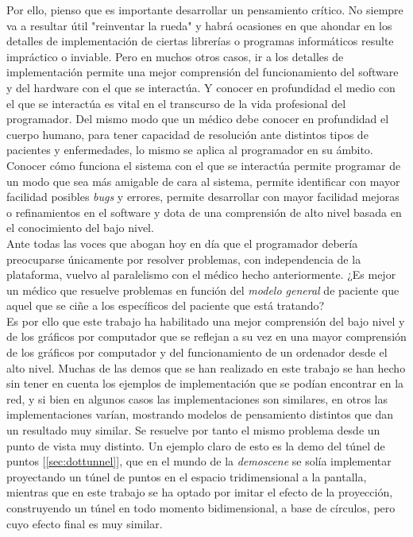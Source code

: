 Por ello, pienso que es importante desarrollar un pensamiento crítico. No siempre va a resultar útil "reinventar la rueda" y habrá ocasiones en que ahondar en los detalles de implementación de ciertas librerías o programas informáticos resulte impráctico o inviable. Pero en muchos otros casos, ir a los detalles de implementación permite una mejor comprensión del funcionamiento del software y del hardware con el que se interactúa. Y conocer en profundidad el medio con el que se interactúa es vital en el transcurso de la vida profesional del programador. Del mismo modo que un médico debe conocer en profundidad el cuerpo humano, para tener capacidad de resolución ante distintos tipos de pacientes y enfermedades, lo mismo se aplica al programador en su ámbito. Conocer cómo funciona el sistema con el que se interactúa permite programar de un modo que sea más amigable de cara al sistema, permite identificar con mayor facilidad posibles \emph{bugs} y errores, permite desarrollar con mayor facilidad mejoras o refinamientos en el software y dota de una comprensión de alto nivel basada en el conocimiento del bajo nivel.\\

Ante todas las voces que abogan hoy en día que el programador debería preocuparse únicamente por resolver problemas, con independencia de la plataforma, vuelvo al paralelismo con el médico hecho anteriormente. ¿Es mejor un médico que resuelve problemas en función del \emph{modelo general} de paciente que aquel que se ciñe a los específicos del paciente que está tratando?\\

Es por ello que este trabajo ha habilitado una mejor comprensión del bajo nivel y de los gráficos por computador que se reflejan a su vez en una mayor comprensión de los gráficos por computador y del funcionamiento de un ordenador desde el alto nivel. Muchas de las demos que se han realizado en este trabajo se han hecho sin tener en cuenta los ejemplos de implementación que se podían encontrar en la red, y si bien en algunos casos las implementaciones son similares, en otros las implementaciones varían, mostrando modelos de pensamiento distintos que dan un resultado muy similar. Se resuelve por tanto el mismo problema desde un punto de vista muy distinto. Un ejemplo claro de esto es la demo del túnel de puntos [\ref{sec:dottunnel}], que en el mundo de la \emph{demoscene} se solía implementar proyectando un túnel de puntos en el espacio tridimensional a la pantalla, mientras que en este trabajo se ha optado por imitar el efecto de la proyección, construyendo un túnel en todo momento bidimensional, a base de círculos, pero cuyo efecto final es muy similar.\\


